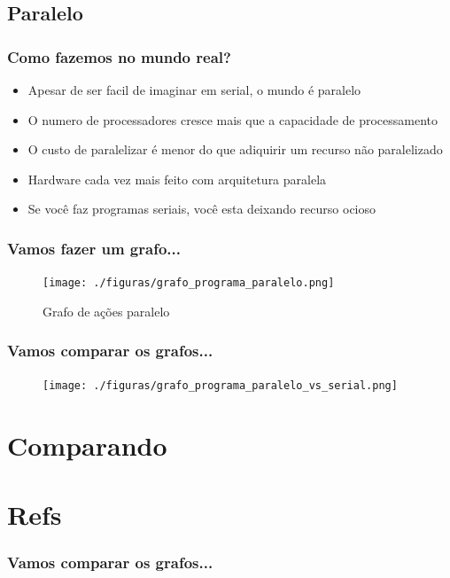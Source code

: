 \documentclass[10pt]{beamer}
\begin{document}
	\subsection{Paralelo}
		\begin{frame}%
		\frametitle{Como fazemos no mundo real?}
			\begin{itemize}[<-+>]
				\item Apesar de ser facil de imaginar em serial, o mundo é paralelo
				\item O numero de processadores cresce mais que a capacidade de processamento
				\item O custo de paralelizar é menor do que adiquirir um recurso não paralelizado
				\item Hardware cada vez mais feito com arquitetura paralela
				\item Se você faz programas seriais, você esta deixando recurso ocioso
			\end{itemize}
		\end{frame}

		\begin{frame}%
		\frametitle{Vamos fazer um grafo...}
			\begin{figure}
			\centering
				\texttt{[image: ./figuras/grafo\_programa\_paralelo.png]}
				\caption{Grafo de ações paralelo }
			\end{figure}
		\end{frame}

		\begin{frame}%
		\frametitle{Vamos comparar os grafos...}
			\begin{figure}
			\centering
				\texttt{[image: ./figuras/grafo\_programa\_paralelo\_vs\_serial.png]}
			\end{figure}
		\end{frame}

\section{Comparando}


\section{Refs}
	\begin{frame}%
	\frametitle{Vamos comparar os grafos...}
		{}
%		
	\end{frame}
\end{document}
